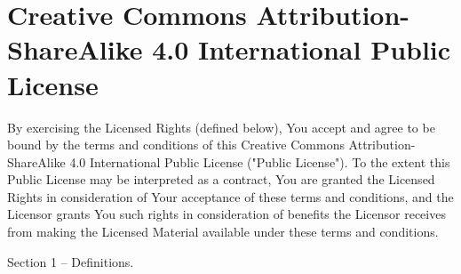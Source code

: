 \section{Creative Commons Attribution-ShareAlike 4.0 International Public License}

By exercising the Licensed Rights (defined below), You accept and agree to be bound by the terms and conditions of this Creative Commons Attribution-ShareAlike 4.0 International Public License ("Public License"). To the extent this Public License may be interpreted as a contract, You are granted the Licensed Rights in consideration of Your acceptance of these terms and conditions, and the Licensor grants You such rights in consideration of benefits the Licensor receives from making the Licensed Material available under these terms and conditions.

Section 1 – Definitions.

